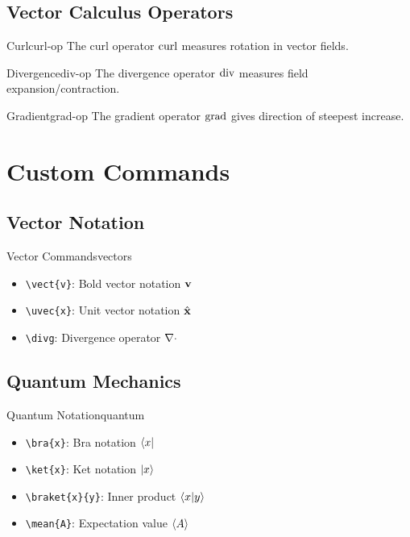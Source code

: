 \documentclass[a4paper]{book}
\begin{document}
\section{Vector Calculus Operators}
\begin{definition}{Curl}{curl-op}
The curl operator \(\operatorname{curl}\) measures rotation in vector fields.
\end{definition}

\begin{definition}{Divergence}{div-op}
The divergence operator \(\operatorname{div}\) measures field expansion/contraction.
\end{definition}

\begin{definition}{Gradient}{grad-op}
The gradient operator \(\operatorname{grad}\) gives direction of steepest increase.
\end{definition}

\chapter{Custom Commands}

\section{Vector Notation}
\begin{definition}{Vector Commands}{vectors}
\begin{itemize}
\item \verb|\vect{v}|: Bold vector notation \(\mathbf{v}\)
\item \verb|\uvec{x}|: Unit vector notation \(\hat{\mathbf{x}}\)
\item \verb|\divg|: Divergence operator \(\nabla\cdot\)
\end{itemize}
\end{definition}

\section{Quantum Mechanics}
\begin{definition}{Quantum Notation}{quantum}
\begin{itemize}
\item \verb|\bra{x}|: Bra notation \(\left\langle x\right|\)
\item \verb|\ket{x}|: Ket notation \(\left|x\right\rangle\)
\item \verb|\braket{x}{y}|: Inner product \(\left\langle x|y\right\rangle\)
\item \verb|\mean{A}|: Expectation value \(\left\langle A\right\rangle\)
\end{itemize}
\end{definition}
\end{document}
